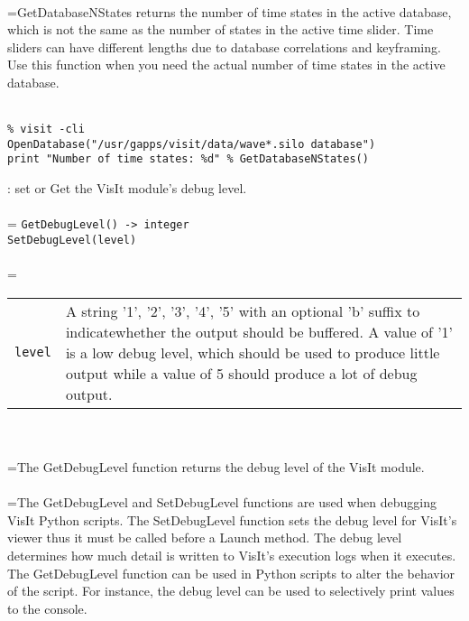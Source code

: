 \documentclass[10pt,a4paper]{report}
\begin{document}
 \\ 
\hangindent=\parindent GetDatabaseNStates returns the number of time states in the active database, which is not the same as the number of states in the active time slider. Time sliders can have different lengths due to database correlations and keyframing. Use this function when you need the actual number of time states in the active database. \\[-3mm] 

\\[-6mm]
\begin{verbatim}% visit -cli
OpenDatabase("/usr/gapps/visit/data/wave*.silo database")
print "Number of time states: %d" % GetDatabaseNStates()
\end{verbatim}
\newpage


{}
: set or Get the VisIt module's debug level.\\[-3mm]

 \\ 
\hangindent=\parindent 
\verb!GetDebugLevel() -> integer!\\ 
\verb!SetDebugLevel(level)!\\ [-3mm]

 \\ 
\hangindent=\parindent 
\begin{tabular}{lp{9cm}}
\verb!level! & A string '1', '2', '3', '4', '5' with an optional 'b' suffix to indicatewhether the output should be buffered. A value of '1' is a low debug level, which should be used to produce little output while a value of 5 should produce a lot of debug output. \\
\end{tabular} \\[-2mm]


 \\ 
\hangindent=\parindent The GetDebugLevel function returns the debug level of the VisIt module. \\[-3mm] 

 \\ 
\hangindent=\parindent The GetDebugLevel and SetDebugLevel functions are used when debugging VisIt Python scripts. The SetDebugLevel function sets the debug level for VisIt's viewer thus it must be called before a Launch method. The debug level determines how much detail is written to VisIt's execution logs when it executes. The GetDebugLevel function can be used in Python scripts to alter the behavior of the script. For instance, the debug level can be used to selectively print values to the console. \\[-3mm] 
\end{document}
